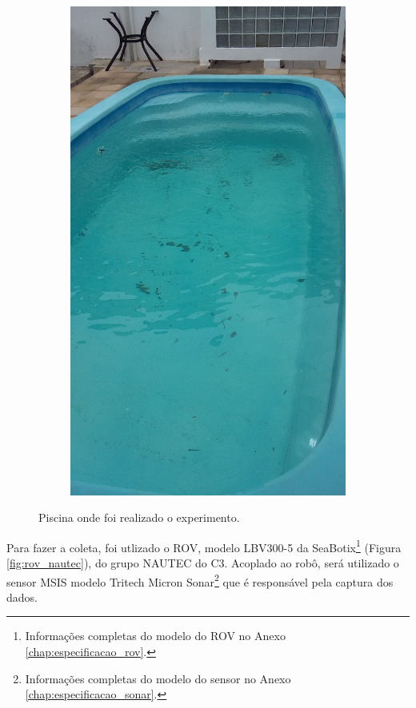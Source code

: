 \begin{figure}[H]
\begin{subfigure}[t]{0.22\textwidth}
        \includegraphics[width=\textwidth]{dados/figuras/piscina_2.jpg}
    \end{subfigure}
    \caption{Piscina onde foi realizado o experimento.}
    \label{fig:piscina}
\end{figure}

Para fazer a coleta, foi utlizado o ROV, modelo LBV300-5 da SeaBotix\footnote{Informações completas do modelo do ROV no Anexo \ref{chap:especificacao_rov}.} (Figura \ref{fig:rov_nautec}), do grupo NAUTEC do C3. 
Acoplado ao robô, será utilizado o sensor MSIS modelo Tritech Micron Sonar\footnote{Informações completas do modelo do sensor no Anexo \ref{chap:especificacao_sonar}.} que é responsável pela captura dos dados.

